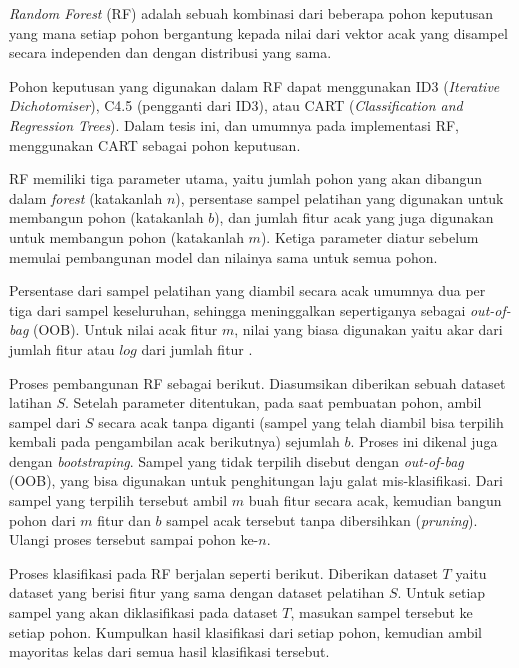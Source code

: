 \textit{Random Forest} (RF) \cite{breiman2001random}
adalah sebuah kombinasi dari beberapa pohon keputusan yang mana setiap pohon
bergantung kepada nilai dari vektor acak yang disampel secara independen dan
dengan distribusi yang sama.

Pohon keputusan yang digunakan dalam RF dapat menggunakan ID3
(\textit{Iterative Dichotomiser}), C4.5 (pengganti dari ID3), atau CART
(\textit{Classification and Regression Trees}).
Dalam tesis ini, dan umumnya pada implementasi RF, menggunakan CART sebagai
pohon keputusan.

RF memiliki tiga parameter utama, yaitu
jumlah pohon yang akan dibangun dalam \textit{forest} (katakanlah $n$),
persentase sampel pelatihan yang digunakan untuk membangun pohon (katakanlah
$b$),
dan jumlah fitur acak yang juga digunakan untuk membangun pohon (katakanlah
$m$).
Ketiga parameter diatur sebelum memulai pembangunan model dan nilainya sama
untuk semua pohon.

Persentase dari sampel pelatihan yang diambil secara acak umumnya dua per tiga
dari sampel keseluruhan, sehingga meninggalkan sepertiganya sebagai
\textit{out-of-bag} (OOB).
Untuk nilai acak fitur $m$, nilai yang biasa digunakan yaitu akar dari jumlah
fitur atau $log$ dari jumlah fitur \cite{breiman2001random}.

Proses pembangunan RF sebagai berikut.
Diasumsikan diberikan sebuah dataset latihan $S$.
Setelah parameter ditentukan, pada saat pembuatan pohon, ambil sampel dari $S$
secara acak tanpa diganti (sampel yang telah diambil bisa terpilih kembali pada
pengambilan acak berikutnya) sejumlah $b$.
Proses ini dikenal juga dengan \textit{bootstraping}.
Sampel yang tidak terpilih disebut dengan \textit{out-of-bag} (OOB), yang
bisa digunakan untuk penghitungan laju galat mis-klasifikasi.
Dari sampel yang terpilih tersebut ambil $m$ buah fitur secara acak, kemudian
bangun pohon dari $m$ fitur dan $b$ sampel acak tersebut tanpa dibersihkan
(\textit{pruning}).
Ulangi proses tersebut sampai pohon ke-$n$.

Proses klasifikasi pada RF berjalan seperti berikut.
Diberikan dataset $T$ yaitu dataset yang berisi fitur yang sama dengan dataset
pelatihan $S$.
Untuk setiap sampel yang akan diklasifikasi pada dataset $T$, masukan sampel
tersebut ke setiap pohon.
Kumpulkan hasil klasifikasi dari setiap pohon, kemudian ambil mayoritas kelas
dari semua hasil klasifikasi tersebut.
